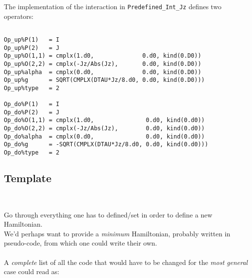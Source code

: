 The implementation of the interaction in \texttt{Predefined\_Int\_Jz} defines two operators:
\begin{lstlisting}[style=fortran]

Op_up%P(1)   = I
Op_up%P(2)   = J
Op_up%O(1,1) = cmplx(1.d0,              0.d0, kind(0.D0))
Op_up%O(2,2) = cmplx(-Jz/Abs(Jz),       0.d0, kind(0.D0))
Op_up%alpha  = cmplx(0.d0,              0.d0, kind(0.D0))
Op_up%g      = SQRT(CMPLX(DTAU*Jz/8.d0, 0.d0, kind(0.D0))) 
Op_up%type   = 2

Op_do%P(1)   = I
Op_do%P(2)   = J
Op_do%O(1,1) = cmplx(1.d0,               0.d0, kind(0.d0))
Op_do%O(2,2) = cmplx(-Jz/Abs(Jz),        0.d0, kind(0.d0))
Op_do%alpha  = cmplx(0.d0,               0.d0, kind(0.d0))
Op_do%g      = -SQRT(CMPLX(DTAU*Jz/8.d0, 0.d0, kind(0.d0))) 
Op_do%type   = 2

\end{lstlisting}



\subsection{Template}

\\
	

  Go through everything one has to defined/set in order to define a new Hamiltonian. \\

We'd perhaps want to provide a \emph{minimum} Hamiltonian, probably written in pseudo-code, from which one could write their own.\\ \\

\noindent A \emph{complete} list of all the code that would have to be changed for the \emph{most general} case could read as:

